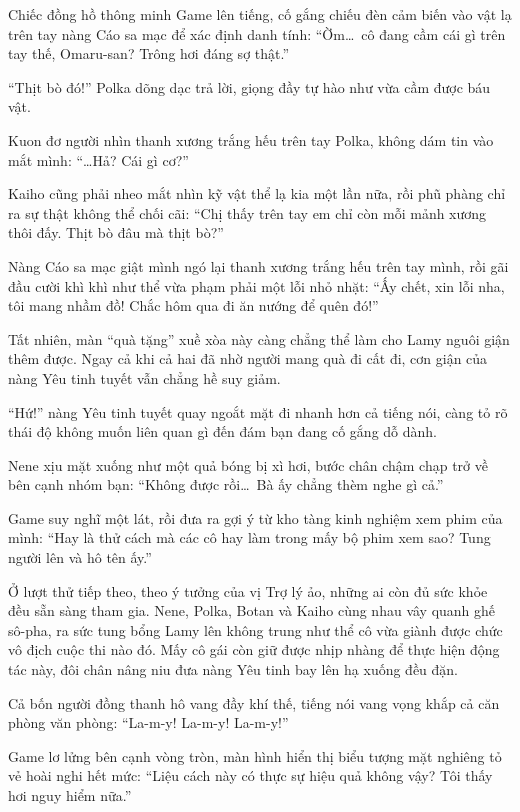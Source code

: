 \documentclass[../main.tex]{subfiles}
\begin{document}
Chiếc đồng hồ thông minh Game lên tiếng, cố gắng chiếu đèn cảm biến vào vật lạ trên tay nàng Cáo sa mạc để xác định danh tính: ``Ờm\dots\ cô đang cầm cái gì trên tay thế, Omaru-san? Trông hơi đáng sợ thật.''

``Thịt bò đó!'' Polka dõng dạc trả lời, giọng đầy tự hào như vừa cầm được báu vật.


Kuon đơ người nhìn thanh xương trắng hếu trên tay Polka, không dám tin vào mắt mình: ``\dots Hả? Cái gì cơ?''

Kaiho cũng phải nheo mắt nhìn kỹ vật thể lạ kia một lần nữa, rồi phũ phàng chỉ ra sự thật không thể chối cãi: ``Chị thấy trên tay em chỉ còn mỗi mảnh xương thôi đấy. Thịt bò đâu mà thịt bò?''

Nàng Cáo sa mạc giật mình ngó lại thanh xương trắng hếu trên tay mình, rồi gãi đầu cười khì khì như thể vừa phạm phải một lỗi nhỏ nhặt: ``Ấy chết, xin lỗi nha, tôi mang nhầm đồ! Chắc hôm qua đi ăn nướng để quên đó!''

Tất nhiên, màn ``quà tặng'' xuề xòa này càng chẳng thể làm cho Lamy nguôi giận thêm được. Ngay cả khi cả hai đã nhờ người mang quà đi cất đi, cơn giận của nàng Yêu tinh tuyết vẫn chẳng hề suy giảm.

``Hứ!'' nàng Yêu tinh tuyết quay ngoắt mặt đi nhanh hơn cả tiếng nói, càng tỏ rõ thái độ không muốn liên quan gì đến đám bạn đang cố gắng dỗ dành.

Nene xịu mặt xuống như một quả bóng bị xì hơi, bước chân chậm chạp trở về bên cạnh nhóm bạn: ``Không được rồi\dots\ Bà ấy chẳng thèm nghe gì cả.''

Game suy nghĩ một lát, rồi đưa ra gợi ý từ kho tàng kinh nghiệm xem phim của mình: ``Hay là thử cách mà các cô hay làm trong mấy bộ phim xem sao? Tung người lên và hô tên ấy.''

\ct

Ở lượt thử tiếp theo, theo ý tưởng của vị Trợ lý ảo, những ai còn đủ sức khỏe đều sẵn sàng tham gia. Nene, Polka, Botan và Kaiho cùng nhau vây quanh ghế sô-pha, ra sức tung bổng Lamy lên không trung như thể cô vừa giành được chức vô địch cuộc thi nào đó. Mấy cô gái còn giữ được nhịp nhàng để thực hiện động tác này, đôi chân nâng niu đưa nàng Yêu tinh bay lên hạ xuống đều đặn.

Cả bốn người đồng thanh hô vang đầy khí thế, tiếng nói vang vọng khắp cả căn phòng văn phòng: ``La-m-y! La-m-y! La-m-y!''


Game lơ lửng bên cạnh vòng tròn, màn hình hiển thị biểu tượng mặt nghiêng tỏ vẻ hoài nghi hết mức: ``Liệu cách này có thực sự hiệu quả không vậy? Tôi thấy hơi nguy hiểm nữa.''
\end{document}
